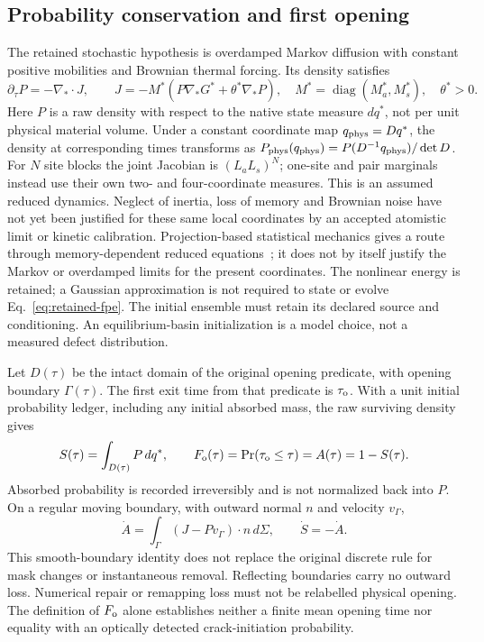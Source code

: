\documentclass[11pt]{article}
\begin{document}
\subsection{Probability conservation and first opening}
The retained stochastic hypothesis is overdamped Markov diffusion with constant
positive mobilities and Brownian thermal forcing. Its density satisfies
\begin{equation}
 \partial_\tau P=-\nabla_*\!\cdot J,\qquad
 J=-M^*\left(P\nabla_*G^*+\theta^*\nabla_*P\right),\quad
 M^*=\operatorname{diag}(M_a^*,M_s^*),\quad\theta^*>0.
 \label{eq:retained-fpe}
\end{equation}
Here $P$ is a raw density with respect to the native state measure $dq^*$,
not per unit physical material volume. Under a constant coordinate map
$q_{\rm phys}=Dq^*$, the density at corresponding times transforms as
$P_{\rm phys}(q_{\rm phys})=P(D^{-1}q_{\rm phys})/\det D$.
For $N$ site blocks the joint Jacobian is $(L_aL_s)^N$;
one-site and pair marginals instead use their own two- and four-coordinate measures.
This is an assumed reduced dynamics. Neglect of inertia, loss of memory and
Brownian noise have not yet been justified for these same local coordinates
by an accepted atomistic limit or kinetic calibration. Projection-based
statistical mechanics gives a route through memory-dependent reduced
equations~\cite{Mori1965}; it does not by itself justify the Markov or
overdamped limits for the present coordinates.
The nonlinear energy is retained; a Gaussian approximation is not required
to state or evolve Eq.~\eqref{eq:retained-fpe}.
The initial ensemble must retain its declared source and conditioning.
An equilibrium-basin initialization is a model choice, not a measured defect distribution.

Let $D(\tau)$ be the intact domain of the original opening predicate, with
opening boundary $\Gamma(\tau)$. The first exit time from that predicate is
$\tau_{\rm o}$. With a unit initial probability ledger, including any initial
absorbed mass, the raw surviving density gives
\begin{equation}
 S(\tau)=\int_{D(\tau)}P\,dq^*,\qquad
 F_{\rm o}(\tau)=\Pr(\tau_{\rm o}\leq\tau)=A(\tau)=1-S(\tau).
\end{equation}
Absorbed probability is recorded irreversibly and is not normalized back into $P$.
On a regular moving boundary, with outward normal $n$ and velocity $v_\Gamma$,
\begin{equation}
 \dot A=\int_\Gamma (J-Pv_\Gamma)\cdot n\,d\Sigma,\qquad \dot S=-\dot A.
\end{equation}
This smooth-boundary identity does not replace the original discrete rule for
mask changes or instantaneous removal. Reflecting boundaries carry no outward
loss. Numerical repair or remapping loss must not be relabelled physical opening.
The definition of $F_{\rm o}$ alone establishes neither a finite mean opening
time nor equality with an optically detected crack-initiation probability.
\end{document}
